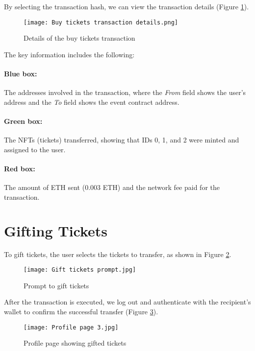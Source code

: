 By selecting the transaction hash, we can view the transaction details (Figure
\ref{fig:buy_tickets_transaction_details}).

\begin{figure}[H]
    \texttt{[image: Buy tickets transaction details.png]}
    \centering
    \caption{Details of the buy tickets transaction}
    \label{fig:buy_tickets_transaction_details}
\end{figure}

The key information includes the following:
\paragraph{Blue box:} The addresses involved in the transaction, where the \textit{From} field shows
the user's address and the \textit{To} field shows the event contract address.
\paragraph{Green box:} The NFTs (tickets) transferred, showing that IDs 0, 1, and 2 were minted and
assigned to the user.
\paragraph{Red box:} The amount of ETH sent (0.003 ETH) and the network fee paid for the
transaction.

\section{Gifting Tickets}
\label{sec:gift_tickets}

To gift tickets, the user selects the tickets to transfer, as shown in Figure
\ref{fig:gift_tickets_prompt}.

\begin{figure}[H]
    \texttt{[image: Gift tickets prompt.jpg]}
    \centering
    \caption{Prompt to gift tickets}
    \label{fig:gift_tickets_prompt}
\end{figure}

After the transaction is executed, we log out and authenticate with the
recipient's wallet to confirm the successful transfer (Figure
\ref{fig:profile_page_3}).

\begin{figure}[H]
    \texttt{[image: Profile page 3.jpg]}
    \centering
    \caption{Profile page showing gifted tickets}
    \label{fig:profile_page_3}
\end{figure}

